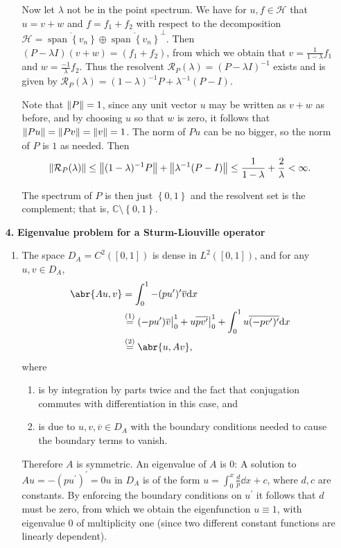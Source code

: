 \documentclass[11pt]{article}
\newcommand{\cbr}[1]{\left\{#1\right\}}
\newcommand{\eq}[1]{\overset{(#1)}{=}}
\DeclareMathOperator{\Span}{span}
\begin{document}
\begin{enumerate}[label=\textbf{\arabic*.}]
\begin{enumerate}[label=\textsf{(\roman*)}]
        Now let $\lambda$ not be in the point spectrum. We have for $u,f\in\mathcal H$ that $u = v+w$ and $f = f_1+ f_2$ with respect to the decomposition $\mathcal H = \overline{\Span\cbr{v_n}} \oplus \overline{\Span\cbr{v_n}}^\perp$. Then $(P-\lambda I)(v+w) = (f_1+f_2)$, from which we obtain that $v = \frac{1}{1-\lambda}f_1$ and $w = \frac{-1}{\lambda}f_2$. Thus the resolvent $\mathcal R_P(\lambda) = (P-\lambda I)^{-1}$ exists and is given by $\mathcal R_P(\lambda) = (1-\lambda)^{-1}P + \lambda^{-1}(P-I)$.

        Note that $\norm{P} = 1$, since any unit vector $u$ may be written as $v+w$ as before, and by choosing $u$ so that $w$ is zero, it follows that $\norm{Pu} = \norm{Pv} = \norm{v} = 1$. The norm of $Pu$ can be no bigger, so the norm of $P$ is $1$ as needed. Then
        \[\norm{\mathcal R_P(\lambda)}\leq \norm{(1-\lambda)^{-1}P} + \norm{\lambda^{-1}(P-I)} \leq \frac{1}{1-\lambda} + \frac{2}{\lambda}<\infty.\]

        The spectrum of $P$ is then just $\cbr{0,1}$ and the resolvent set is the complement; that is, $\mathbb C\setminus \cbr{0,1}$.
    \end{enumerate}
    \hrulefill
    \item[\textbf{4.}] \textbf{Eigenvalue problem for a Sturm-Liouville operator} 
    \begin{enumerate}[label=\textsf{(\roman*)}]
        \item The space $D_A = C^2([0,1])$ is dense in $L^2([0,1])$, and for any $u,v\in D_A$,
        \begin{align*}
            \abr{Au,v} &= \int_{0}^{1}-(pu^\prime)^\prime \overline{v} \dd x\\
            &\eq{1} (-pu^\prime)\overline{v}\big|_0^1 + u\overline{pv^\prime}\big|_0^1+\int_0^1u\overline{(-pv^\prime)^\prime}\dd x\\
            &\eq{2} \abr{u,Av},
        \end{align*}
        where \begin{enumerate}[label=(\arabic*)]
            \item is by integration by parts twice and the fact that conjugation commutes with differentiation in this case, and
            \item is due to $u,v,\overline{v}\in D_A$ with the boundary conditions needed to cause the boundary terms to vanish.
        \end{enumerate}
        Therefore $A$ is symmetric. An eigenvalue of $A$ is $0$: A solution to $Au = -(pu^\prime)^\prime = 0u$ in $D_A$ is of the form $u = \int_0^x \frac{d}{p} \dd x + c$, where $d,c$ are constants. By enforcing the boundary conditions on $u^\prime$ it follows that $d$ must be zero, from which we obtain the eigenfunction $u \equiv 1$, with eigenvalue $0$ of multiplicity one (since two different constant functions are linearly dependent).


\end{enumerate}
\end{enumerate}
\end{document}
